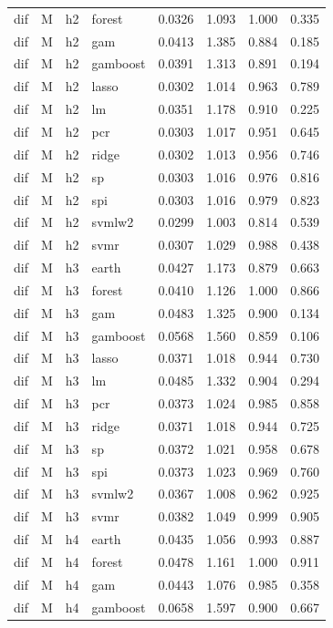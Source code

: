 \begin{ThreePartTable}
\begin{longtable}[t]{llclcccc}
dif & M & h2 & forest & 0.0326 & 1.093 & 1.000 & 0.335\\
dif & M & h2 & gam & 0.0413 & 1.385 & 0.884 & 0.185\\
dif & M & h2 & gamboost & 0.0391 & 1.313 & 0.891 & 0.194\\
dif & M & h2 & lasso & 0.0302 & 1.014 & 0.963 & 0.789\\
dif & M & h2 & lm & 0.0351 & 1.178 & 0.910 & 0.225\\
dif & M & h2 & pcr & 0.0303 & 1.017 & 0.951 & 0.645\\
dif & M & h2 & ridge & 0.0302 & 1.013 & 0.956 & 0.746\\
dif & M & h2 & sp & 0.0303 & 1.016 & 0.976 & 0.816\\
dif & M & h2 & spi & 0.0303 & 1.016 & 0.979 & 0.823\\
dif & M & h2 & svmlw2 & 0.0299 & 1.003 & 0.814 & 0.539\\
dif & M & h2 & svmr & 0.0307 & 1.029 & 0.988 & 0.438\\
\addlinespace
dif & M & h3 & earth & 0.0427 & 1.173 & 0.879 & 0.663\\
dif & M & h3 & forest & 0.0410 & 1.126 & 1.000 & 0.866\\
dif & M & h3 & gam & 0.0483 & 1.325 & 0.900 & 0.134\\
dif & M & h3 & gamboost & 0.0568 & 1.560 & 0.859 & 0.106\\
dif & M & h3 & lasso & 0.0371 & 1.018 & 0.944 & 0.730\\
dif & M & h3 & lm & 0.0485 & 1.332 & 0.904 & 0.294\\
dif & M & h3 & pcr & 0.0373 & 1.024 & 0.985 & 0.858\\
dif & M & h3 & ridge & 0.0371 & 1.018 & 0.944 & 0.725\\
dif & M & h3 & sp & 0.0372 & 1.021 & 0.958 & 0.678\\
dif & M & h3 & spi & 0.0373 & 1.023 & 0.969 & 0.760\\
dif & M & h3 & svmlw2 & 0.0367 & 1.008 & 0.962 & 0.925\\
dif & M & h3 & svmr & 0.0382 & 1.049 & 0.999 & 0.905\\
\addlinespace
dif & M & h4 & earth & 0.0435 & 1.056 & 0.993 & 0.887\\
dif & M & h4 & forest & 0.0478 & 1.161 & 1.000 & 0.911\\
dif & M & h4 & gam & 0.0443 & 1.076 & 0.985 & 0.358\\
dif & M & h4 & gamboost & 0.0658 & 1.597 & 0.900 & 0.667\\

\end{longtable}
\end{ThreePartTable}
